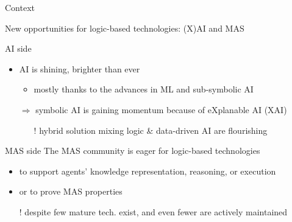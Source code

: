 \documentclass[presentation]{beamer}
\begin{document}
\begin{frame}[c]{Context}

	New opportunities for logic-based technologies: (X)AI and MAS

	\vfill

    \begin{block}{AI side}
        \begin{itemize}
            \item AI is shining, brighter than ever
            \begin{itemize}
                \item mostly thanks to the advances in ML and sub-symbolic AI
            \end{itemize}

            \item[$\Rightarrow$] symbolic AI is gaining momentum because of eXplanable AI (XAI)
            \begin{itemize}
                \item[!] hybrid solution mixing logic \& data-driven AI are flourishing 
            \end{itemize}
        \end{itemize}
    \end{block}

	\vfill

    \begin{block}{MAS side}
        The MAS community is eager for logic-based technologies 
        \begin{itemize}
            \item to support agents' knowledge representation, reasoning, or execution

            \item or to prove MAS properties

            \item[!] despite few mature tech. exist, and even fewer are actively maintained
        \end{itemize}
    \end{block}
\end{frame}
\end{document}
